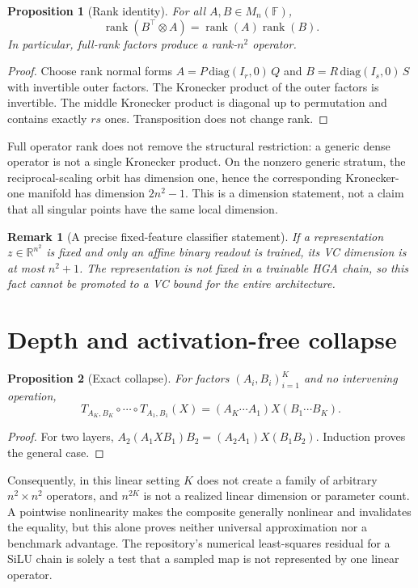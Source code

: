 \documentclass[11pt]{article}
\newtheorem{proposition}{Proposition}
\newtheorem{remark}{Remark}
\begin{document}
\begin{proposition}[Rank identity]
For all $A,B\in M_n(\mathbb F)$,
\[
 \operatorname{rank}(B^\top\otimes A)=\operatorname{rank}(A)\operatorname{rank}(B).
\]
In particular, full-rank factors produce a rank-$n^2$ operator.
\end{proposition}
\begin{proof}
Choose rank normal forms $A=P\,\mathrm{diag}(I_r,0)\,Q$ and
$B=R\,\mathrm{diag}(I_s,0)\,S$ with invertible outer factors. The Kronecker
product of the outer factors is invertible. The middle Kronecker product is
diagonal up to permutation and contains exactly $rs$ ones. Transposition does
not change rank.
\end{proof}

Full operator rank does not remove the structural restriction: a generic dense
operator is not a single Kronecker product. On the nonzero generic stratum,
the reciprocal-scaling orbit has dimension one, hence the corresponding
Kronecker-one manifold has dimension $2n^2-1$. This is a dimension statement,
not a claim that all singular points have the same local dimension.

\begin{remark}[A precise fixed-feature classifier statement]
If a representation $z\in\mathbb R^{n^2}$ is fixed and only an affine binary
readout is trained, its VC dimension is at most $n^2+1$. The representation is
not fixed in a trainable HGA chain, so this fact cannot be promoted to a VC
bound for the entire architecture.
\end{remark}

\section{Depth and activation-free collapse}
\begin{proposition}[Exact collapse]
For factors $(A_i,B_i)_{i=1}^K$ and no intervening operation,
\[
 T_{A_K,B_K}\circ\cdots\circ T_{A_1,B_1}(X)
 =\left(A_K\cdots A_1\right)X\left(B_1\cdots B_K\right).
\]
\end{proposition}
\begin{proof}
For two layers,
$A_2(A_1XB_1)B_2=(A_2A_1)X(B_1B_2)$. Induction proves the general case.
\end{proof}

Consequently, in this linear setting $K$ does not create a family of arbitrary
$n^2\times n^2$ operators, and $n^{2K}$ is not a realized linear dimension or
parameter count. A pointwise nonlinearity makes the composite generally
nonlinear and invalidates the equality, but this alone proves neither
universal approximation nor a benchmark advantage. The repository's numerical
least-squares residual for a SiLU chain is solely a test that a sampled map is
not represented by one linear operator.
\end{document}

